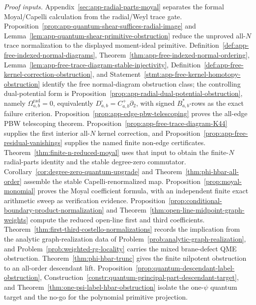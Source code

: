 \begin{stmt}
  \emph{Proof inputs.}
  Appendix~\ref{sec:app-radial-parts-moyal} separates the formal
  Moyal/Capelli calculation from the radial/Weyl trace gate.
  Proposition~\ref{prop:app-quantum-shear-suffices-radial-image} and
  Lemma~\ref{lem:app-quantum-shear-primitive-obstruction} reduce the
  unproved all-\(N\) trace normalization to the displayed
  moment-ideal primitive.
  Definition~\ref{def:app-free-indexed-normal-diagrams},
  Theorem~\ref{thm:app-free-indexed-normal-ordering},
  Lemma~\ref{lem:app-free-trace-diagram-stable-injectivity},
  Definition~\ref{def:app-free-kernel-correction-obstruction}, and
  Statement~\ref{stmt:app-free-kernel-homotopy-obstruction} identify the
  free normal-diagram obstruction class; the controlling
  dual-potential form is
  Proposition~\ref{prop:app-radial-dual-potential-obstruction}, namely
  \(\Omega^{\mathrm{rad}}_{a,b}=0\), equivalently
  \(D^\square_{a,b}=C^+_{a,b}\partial_2\), with signed
  \(B_{a,b}^*\)-rows as the exact failure criterion.
  Proposition~\ref{prop:app-edge-pbw-telescoping} proves the all-edge PBW
  telescoping theorem.  Proposition~\ref{prop:app-free-trace-diagram-K44}
  supplies the first interior all-\(N\) kernel correction, and
  Proposition~\ref{prop:app-free-residual-vanishings} supplies the
  named finite non-edge certificates.
  Theorem~\ref{thm:finite-n-reduced-moyal} uses that input to obtain
  the finite-\(N\) radial-parts identity and the stable degree-zero
  commutator.
  Corollary~\ref{cor:degree-zero-quantum-upgrade} and
  Theorem~\ref{thm:phi-hbar-all-order} assemble the stable
  Capelli-renormalized map.  Proposition~\ref{prop:moyal-monomial}
  proves the Moyal coefficient formula, with an independent finite exact
  arithmetic sweep as verification evidence.  Proposition~\ref{prop:conditional-boundary-product-normalization}
  and Theorem~\ref{thm:open-line-midpoint-graph-weights} compute
  the reduced open-line first and third coefficients.
  Theorem~\ref{thm:first-third-costello-normalizations} records the
  implication from the analytic graph-realization data of
  Problem~\ref{prob:analytic-graph-realization}, and
  Problem~\ref{prob:weighted-rg-locality} carries the mixed
  brane-defect QME obstruction.  Theorem~\ref{thm:phi-hbar-trunc}
  gives the finite nilpotent obstruction to an all-order descendant
  lift.  Proposition~\ref{prop:quantum-descendant-label-obstruction},
  Construction~\ref{constr:quantum-principal-part-descendant-target},
  and Theorem~\ref{thm:one-psi-label-hbar-obstruction} isolate
  the one-\(\psi\) quantum target and the no-go for the polynomial
  primitive projection.


\end{stmt}

